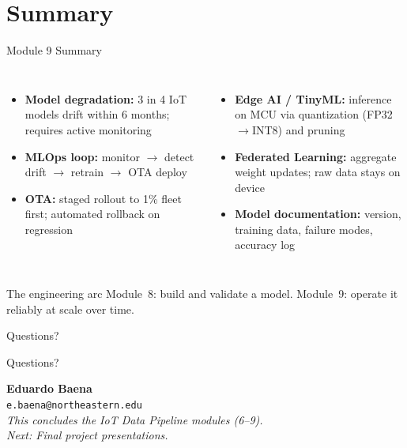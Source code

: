 \documentclass[aspectratio=169,11pt]{beamer}
\begin{document}
\section{Summary}

\begin{frame}{Module 9 Summary}
    \small
    \begin{columns}
        \begin{itemize}\setlength{\itemsep}{10pt}
            \item \textbf{Model degradation:} 3 in 4 IoT models drift within 6 months; requires active monitoring
            \item \textbf{MLOps loop:} monitor $\rightarrow$ detect drift $\rightarrow$ retrain $\rightarrow$ OTA deploy
            \item \textbf{OTA:} staged rollout to 1\% fleet first; automated rollback on regression
        \end{itemize}

        \begin{itemize}\setlength{\itemsep}{10pt}
            \item \textbf{Edge AI / TinyML:} inference on MCU via quantization (FP32$\rightarrow$INT8) and pruning
            \item \textbf{Federated Learning:} aggregate weight updates; raw data stays on device
            \item \textbf{Model documentation:} version, training data, failure modes, accuracy log
        \end{itemize}
    \end{columns}

    \vspace{0.3cm}
    \begin{exampleblock}{The engineering arc}
        Module~8: build and validate a model. Module~9: operate it reliably at scale over time.
    \end{exampleblock}
\end{frame}

\begin{frame}{Questions?}
    \begin{center}
        \Huge Questions?

        \vspace{0.8cm}
        \normalsize
        \textbf{Eduardo Baena}\\
        \texttt{e.baena@northeastern.edu}\\[0.3cm]
        \textit{This concludes the IoT Data Pipeline modules (6--9).}\\
        \textit{Next: Final project presentations.}
    \end{center}
\end{frame}
\end{document}
